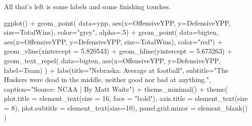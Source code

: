 \documentclass[
]{book}
\newenvironment{Shaded}{\begin{snugshade}}{\end{snugshade}}
\newcommand{\AttributeTok}[1]{\textcolor[rgb]{0.77,0.63,0.00}{#1}}
\newcommand{\DecValTok}[1]{\textcolor[rgb]{0.00,0.00,0.81}{#1}}
\newcommand{\FloatTok}[1]{\textcolor[rgb]{0.00,0.00,0.81}{#1}}
\newcommand{\FunctionTok}[1]{\textcolor[rgb]{0.00,0.00,0.00}{#1}}
\newcommand{\NormalTok}[1]{#1}
\newcommand{\SpecialCharTok}[1]{\textcolor[rgb]{0.00,0.00,0.00}{#1}}
\newcommand{\StringTok}[1]{\textcolor[rgb]{0.31,0.60,0.02}{#1}}
\begin{document}
All that's left is some labels and some finishing touches.

\begin{Shaded}
\begin{Highlighting}[]
\FunctionTok{ggplot}\NormalTok{() }\SpecialCharTok{+} 
  \FunctionTok{geom\_point}\NormalTok{(}
    \AttributeTok{data=}\NormalTok{ypp, }
    \FunctionTok{aes}\NormalTok{(}\AttributeTok{x=}\NormalTok{OffensiveYPP, }\AttributeTok{y=}\NormalTok{DefensiveYPP, }\AttributeTok{size=}\NormalTok{TotalWins), }
    \AttributeTok{color=}\StringTok{"grey"}\NormalTok{, }
    \AttributeTok{alpha=}\NormalTok{.}\DecValTok{5}\NormalTok{) }\SpecialCharTok{+} 
  \FunctionTok{geom\_point}\NormalTok{(}
    \AttributeTok{data=}\NormalTok{bigten, }
    \FunctionTok{aes}\NormalTok{(}\AttributeTok{x=}\NormalTok{OffensiveYPP, }\AttributeTok{y=}\NormalTok{DefensiveYPP, }\AttributeTok{size=}\NormalTok{TotalWins), }
    \AttributeTok{color=}\StringTok{"red"}\NormalTok{) }\SpecialCharTok{+} 
  \FunctionTok{geom\_vline}\NormalTok{(}\AttributeTok{xintercept =} \FloatTok{5.820543}\NormalTok{) }\SpecialCharTok{+} 
  \FunctionTok{geom\_hline}\NormalTok{(}\AttributeTok{yintercept =} \FloatTok{5.673263}\NormalTok{) }\SpecialCharTok{+} 
  \FunctionTok{geom\_text\_repel}\NormalTok{(}
    \AttributeTok{data=}\NormalTok{bigten, }
    \FunctionTok{aes}\NormalTok{(}\AttributeTok{x=}\NormalTok{OffensiveYPP, }\AttributeTok{y=}\NormalTok{DefensiveYPP, }\AttributeTok{label=}\NormalTok{Team)}
\NormalTok{  ) }\SpecialCharTok{+}
  \FunctionTok{labs}\NormalTok{(}\AttributeTok{title=}\StringTok{"Nebraska: Average at football"}\NormalTok{, }\AttributeTok{subtitle=}\StringTok{"The Husker\textquotesingle{}s were dead in the middle, neither good nor bad at anything."}\NormalTok{, }\AttributeTok{caption=}\StringTok{"Source: NCAA | By Matt Waite"}\NormalTok{)  }\SpecialCharTok{+} \FunctionTok{theme\_minimal}\NormalTok{() }\SpecialCharTok{+} 
  \FunctionTok{theme}\NormalTok{(}
    \AttributeTok{plot.title =} \FunctionTok{element\_text}\NormalTok{(}\AttributeTok{size =} \DecValTok{16}\NormalTok{, }\AttributeTok{face =} \StringTok{"bold"}\NormalTok{),}
    \AttributeTok{axis.title =} \FunctionTok{element\_text}\NormalTok{(}\AttributeTok{size =} \DecValTok{8}\NormalTok{), }
    \AttributeTok{plot.subtitle =} \FunctionTok{element\_text}\NormalTok{(}\AttributeTok{size=}\DecValTok{10}\NormalTok{), }
    \AttributeTok{panel.grid.minor =} \FunctionTok{element\_blank}\NormalTok{()}
\NormalTok{    )}
\end{Highlighting}
\end{Shaded}
\end{document}
